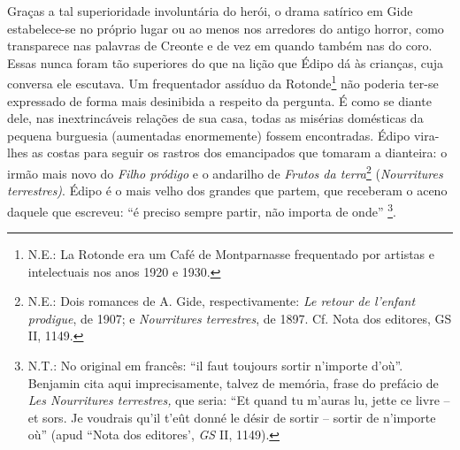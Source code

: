 Graças a tal superioridade involuntária do herói, o drama satírico em
Gide estabelece-se no próprio lugar ou ao menos nos arredores do antigo
horror, como transparece nas palavras de Creonte e de vez em quando
também nas do coro. Essas nunca foram tão superiores do que na lição que
Édipo dá às crianças, cuja conversa ele escutava. Um frequentador
assíduo da Rotonde\footnote{N.E.: La Rotonde era um Café de Montparnasse
  frequentado por artistas e intelectuais nos anos 1920 e 1930.} não
poderia ter-se expressado de forma mais desinibida a respeito da
pergunta. É como se diante dele, nas inextrincáveis relações de sua
casa, todas as misérias domésticas da pequena burguesia (aumentadas
enormemente) fossem encontradas. Édipo vira-lhes as costas para seguir
os rastros dos emancipados que tomaram a dianteira: o irmão mais novo do
\emph{Filho pródigo} e o andarilho de \emph{Frutos da terra}\footnote{N.E.:
  Dois romances de A. Gide, respectivamente: \emph{Le retour de l'enfant
  prodigue}, de 1907; e \emph{Nourritures terrestres}, de 1897. Cf. Nota
  dos editores, GS II, 1149.} (\emph{Nourritures terrestres)}. Édipo é o
mais velho dos grandes que partem, que receberam o aceno daquele que
escreveu: ``é preciso sempre partir, não importa de onde'' \footnote{N.T.:
  No original em francês: ``il faut toujours sortir n'importe d'où''.
  Benjamin cita aqui imprecisamente, talvez de memória, frase do
  prefácio de \emph{Les Nourritures terrestres,} que seria: ``Et quand
  tu m'auras lu, jette ce livre -- et sors. Je voudrais qu'il t'eût
  donné le désir de sortir -- sortir de n'importe où'' (apud ``Nota dos
  editores', \emph{GS} II, 1149).}.
